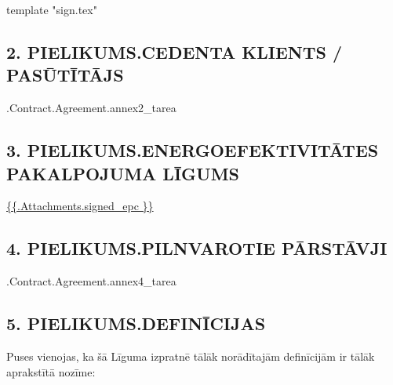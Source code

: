 \documentclass[a4paper]{article}
\begin{document}
{{template "sign.tex"}}

\subsection{2. PIELIKUMS.CEDENTA KLIENTS / PASŪTĪTĀJS}

\iffalse input forfaitingFields.annex2_tarea value="{{.Contract.Agreement.annex2_tarea}}" type="textarea" \fi {{.Contract.Agreement.annex2_tarea}}

\pagebreak

\subsection{3. PIELIKUMS.ENERGOEFEKTIVITĀTES PAKALPOJUMA LĪGUMS}

\url{ {{.Attachments.signed_epc }} }

\iffalse attachment value="signed epc" \fi

\pagebreak

\subsection{4. PIELIKUMS.PILNVAROTIE PĀRSTĀVJI}

\iffalse input forfaitingFields.annex4_tarea value="{{.Contract.Agreement.annex4_tarea}}" type="textarea" \fi {{.Contract.Agreement.annex4_tarea}}

\pagebreak

\subsection{5. PIELIKUMS.DEFINĪCIJAS}


\renewcommand*{\theenumi}{\roman{enumi}}

Puses vienojas, ka šā Līguma izpratnē tālāk norādītajām definīcijām ir tālāk aprakstītā nozīme: \par
\end{document}
